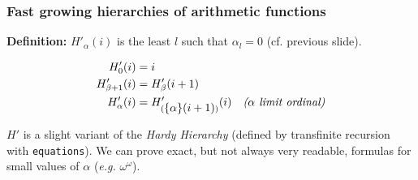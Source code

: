 \documentclass[10pt, fleqn]{beamer}
\begin{document}
\begin{frame}
  \frametitle{Fast growing hierarchies of arithmetic functions}




\textbf{Definition: }
  \textcolor{mathcolor}{$H'_\alpha(i)$} is the least $l$ such that \textcolor{mathcolor}{$\alpha_l=0$} (cf. previous slide). 

 
 {\color{mathcolor}
\begin{align}
  H'_0(i) & = i\\
  H'_{\beta+1}(i) &=H'_\beta(i+1) \\
  H'_\alpha(i) &= H'_{(\mbox{$\{\alpha\}(i+1)$})}(i)  \quad\textit{($\alpha$ limit ordinal)} 
\end{align}}


\textcolor{mathcolor}{$H'$} is a slight variant of the \emph{Hardy Hierarchy} (defined by transfinite recursion with \texttt{equations}).
 We can prove exact, but not always very readable, formulas for small values of \textcolor{mathcolor}{$\alpha$} (\emph{e.g.} \textcolor{mathcolor}{$\omega^\omega$}).

  




\end{frame}



 
\end{document}
